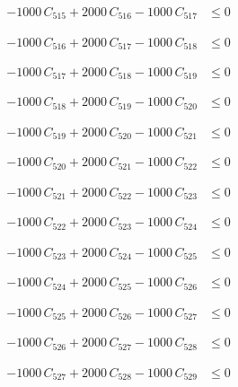 \documentclass[a4paper,11pt]{article}
\begin{document}
\begin{align}
-1000\,C_{515} + 2000\,C_{516} - 1000\,C_{517} &\leq 0 \nonumber
\end{align}

\begin{align}
-1000\,C_{516} + 2000\,C_{517} - 1000\,C_{518} &\leq 0 \nonumber
\end{align}

\begin{align}
-1000\,C_{517} + 2000\,C_{518} - 1000\,C_{519} &\leq 0 \nonumber
\end{align}

\begin{align}
-1000\,C_{518} + 2000\,C_{519} - 1000\,C_{520} &\leq 0 \nonumber
\end{align}

\begin{align}
-1000\,C_{519} + 2000\,C_{520} - 1000\,C_{521} &\leq 0 \nonumber
\end{align}

\begin{align}
-1000\,C_{520} + 2000\,C_{521} - 1000\,C_{522} &\leq 0 \nonumber
\end{align}

\begin{align}
-1000\,C_{521} + 2000\,C_{522} - 1000\,C_{523} &\leq 0 \nonumber
\end{align}

\begin{align}
-1000\,C_{522} + 2000\,C_{523} - 1000\,C_{524} &\leq 0 \nonumber
\end{align}

\begin{align}
-1000\,C_{523} + 2000\,C_{524} - 1000\,C_{525} &\leq 0 \nonumber
\end{align}

\begin{align}
-1000\,C_{524} + 2000\,C_{525} - 1000\,C_{526} &\leq 0 \nonumber
\end{align}

\begin{align}
-1000\,C_{525} + 2000\,C_{526} - 1000\,C_{527} &\leq 0 \nonumber
\end{align}

\begin{align}
-1000\,C_{526} + 2000\,C_{527} - 1000\,C_{528} &\leq 0 \nonumber
\end{align}

\begin{align}
-1000\,C_{527} + 2000\,C_{528} - 1000\,C_{529} &\leq 0 \nonumber
\end{align}
\end{document}
